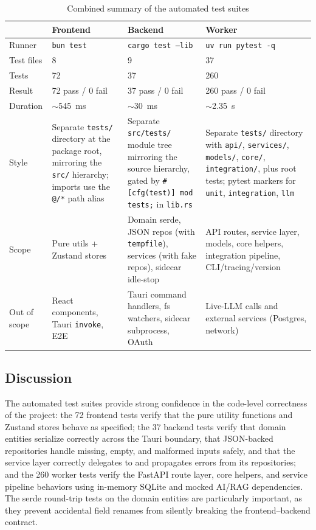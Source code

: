 \documentclass[12pt,oneside,openright,a4paper]{cpe-english-project}
\begin{document}
\begin{table}[H]
\centering
\caption{Combined summary of the automated test suites}
\small
\begin{tabular}{|p{}|p{}|p{}|p{}|}
\hline
 & \textbf{Frontend} & \textbf{Backend} & \textbf{Worker} \\
\hline
Runner       & \texttt{bun test} & \texttt{cargo test --lib} & \texttt{uv run pytest -q} \\
\hline
Test files   & 8 & 9 & 37 \\
\hline
Tests        & 72 & 37 & 260 \\
\hline
Result       & 72 pass / 0 fail & 37 pass / 0 fail & 260 pass / 0 fail \\
\hline
Duration     & $\sim$545~ms & $\sim$30~ms & $\sim$2.35~s \\
\hline
Style        & Separate \texttt{tests/} directory at the package root, mirroring the \texttt{src/} hierarchy; imports use the \texttt{@/*} path alias & Separate \texttt{src/tests/} module tree mirroring the source hierarchy, gated by \texttt{\#[cfg(test)] mod tests;} in \texttt{lib.rs} & Separate \texttt{tests/} directory with \texttt{api/}, \texttt{services/}, \texttt{models/}, \texttt{core/}, \texttt{integration/}, plus root tests; pytest markers for \texttt{unit}, \texttt{integration}, \texttt{llm} \\
\hline
Scope        & Pure utils + Zustand stores & Domain serde, JSON repos (with \texttt{tempfile}), services (with fake repos), sidecar idle-stop & API routes, service layer, models, core helpers, integration pipeline, CLI/tracing/version \\
\hline
Out of scope & React components, Tauri \texttt{invoke}, E2E & Tauri command handlers, fs watchers, sidecar subprocess, OAuth & Live-LLM calls and external services (Postgres, network) \\
\hline
\end{tabular}
\end{table}

\subsection{Discussion}
The automated test suites provide strong confidence in the code-level correctness of the project: the 72 frontend tests verify that the pure utility functions and Zustand stores behave as specified; the 37 backend tests verify that domain entities serialize correctly across the Tauri boundary, that JSON-backed repositories handle missing, empty, and malformed inputs safely, and that the service layer correctly delegates to and propagates errors from its repositories; and the 260 worker tests verify the FastAPI route layer, core helpers, and service pipeline behaviors using in-memory SQLite and mocked AI/RAG dependencies. The serde round-trip tests on the domain entities are particularly important, as they prevent accidental field renames from silently breaking the frontend--backend contract.
\end{document}
